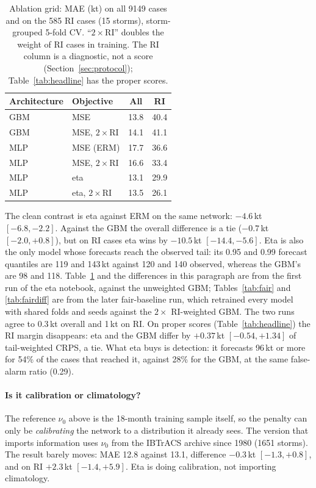 \documentclass[11pt]{article}
\begin{document}
\begin{table}[t]
\centering
\caption{Ablation grid: MAE (kt) on all 9149 cases and on the 585 RI cases (15 storms),
storm-grouped 5-fold CV. ``$2\times$RI'' doubles the weight of RI cases in training. The RI
column is a diagnostic, not a score (Section~\ref{sec:protocol}); Table~\ref{tab:headline} has
the proper scores.}
\label{tab:eta}
\begin{tabular}{llcc}
\toprule
Architecture & Objective & All & RI \\
\midrule
GBM & MSE                  & 13.8 & 40.4 \\
GBM & MSE, $2\times$RI     & 14.1 & 41.1 \\
MLP & MSE (ERM)            & 17.7 & 36.6 \\
MLP & MSE, $2\times$RI     & 16.6 & 33.4 \\
MLP & eta                  & 13.1 & 29.9 \\
MLP & eta, $2\times$RI     & 13.5 & 26.1 \\
\bottomrule
\end{tabular}
\end{table}

The clean contrast is eta against ERM on the same network: $-4.6$\,kt $[-6.8, -2.2]$. Against
the GBM the overall difference is a tie ($-0.7$\,kt $[-2.0, +0.8]$), but on RI cases eta wins by
$-10.5$\,kt $[-14.4, -5.6]$. Eta is also the only model whose forecasts reach the observed tail:
its 0.95 and 0.99 forecast quantiles are 119 and 143\,kt against 120 and 140 observed, whereas the
GBM's are 98 and 118. Table~\ref{tab:eta} and the differences in this paragraph are from the
first run of the eta notebook, against the unweighted GBM; Tables~\ref{tab:fair} and
\ref{tab:fairdiff} are from the later fair-baseline run, which retrained every model with shared
folds and seeds against the $2\times$ RI-weighted GBM. The two runs agree to 0.3\,kt overall and
1\,kt on RI. On proper scores (Table~\ref{tab:headline}) the RI margin disappears: eta
and the GBM differ by $+0.37$\,kt $[-0.54, +1.34]$ of tail-weighted CRPS, a tie. What eta buys is
detection: it forecasts 96\,kt or more for 54\% of the cases that reached it, against 28\% for the
GBM, at the same false-alarm ratio (0.29).

\paragraph{Is it calibration or climatology?} The reference $\nu_0$ above is the 18-month
training sample itself, so the penalty can only be \emph{calibrating} the network to a
distribution it already sees. The version that imports information uses $\nu_0$ from the
IBTrACS archive since 1980 (1651 storms). The result barely moves: MAE 12.8 against 13.1,
difference $-0.3$\,kt $[-1.3, +0.8]$, and on RI $+2.3$\,kt $[-1.4, +5.9]$. Eta is doing
calibration, not importing climatology.
\end{document}
